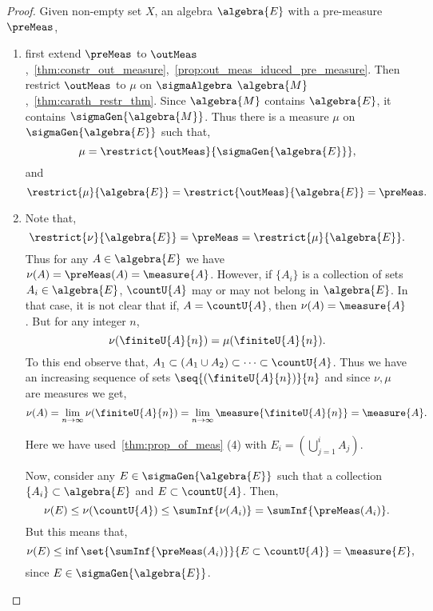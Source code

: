 \begin{proof}
    Given non-empty set $X$, an algebra $\algebra{E}$ with a pre-measure $\preMeas$,
    \begin{enumerate}
	\item
	    first extend $\preMeas$ to
	    $\outMeas$,~\ref{thm:constr_out_measure},~\ref{prop:out_meas_iduced_pre_measure}. Then
	    restrict $\outMeas$ to $\mu$ on $\sigmaAlgebra$ 
	    $\algebra{M}$,~\ref{thm:carath_restr_thm}. Since
	    $\algebra{M}$ contains $\algebra{E}$, it contains $\sigmaGen{\algebra{M}}$. Thus there is
	    a measure $\mu$ on $\sigmaGen{\algebra{E}}$ such that,
	    \[\mu = \restrict{\outMeas}{\sigmaGen{\algebra{E}}},\] and 
	    \[\restrict{\mu}{\algebra{E}} = \restrict{\outMeas}{\algebra{E}} = \preMeas.\]
	\item
	    Note that, \[\restrict{\nu}{\algebra{E}} = \preMeas = \restrict{\mu}{\algebra{E}}.\] 
	    Thus for any $A \in \algebra{E}$ we have $\nu(A) = \preMeas(A) = \measure{A}$. However,
	    if $\lbrace A_i \rbrace $ is a collection of sets $A_i \in \algebra{E}$, $\countU{A}$ may
	    or may not belong in $\algebra{E}$. In that case, it is not clear that if, 
	    $A = \countU{A}$, then $\nu(A) = \measure{A}$. But for any integer $n$,
	    \[\nu(\finiteU{A}{n}) = \mu(\finiteU{A}{n}).\]
	    To this end observe that,
	    $A_1 \subset (A_1\cup A_2) \subset \dots \subset \countU{A}$. 
	    Thus we have an increasing sequence of sets $\seq{(\finiteU{A}{n})}{n}$ and 
	    since $\nu,\mu$ are
	    measures we get,
	    \[\nu(A) = \lim\limits_{n\to\infty}\nu(\finiteU{A}{n}) =
		\lim\limits_{n\to\infty}\measure{\finiteU{A}{n}} = \measure{A}.\]
	    
	    Here we have used~\ref{thm:prop_of_meas} (4) with $E_i =
	    (\bigcup\limits_{j=1}^{i}A_j)$.

	    Now, consider any $E \in \sigmaGen{\algebra{E}}$ such that a collection $\lbrace A_i
	    \rbrace \subset \algebra{E}$ and $E \subset \countU{A}$. Then,
	    \[\nu(E) \leq \nu(\countU{A}) \leq \sumInf{\nu(A_i)} = \sumInf{\preMeas(A_i)}.\]
	    But this means that,
	    \[\nu(E) \leq \inf\set{\sumInf{\preMeas(A_i)}}{E\subset\countU{A}} = \measure{E},\]
	    since $E \in \sigmaGen{\algebra{E}}$.


\end{enumerate}
\end{proof}
